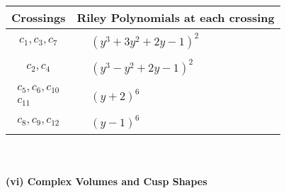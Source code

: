 \documentclass[1p]{elsarticle_modified}
\theoremstyle{definition}
\begin{document}
\begin{tabular}{m{50pt}|m{274pt}}
Crossings & \hspace{64pt}Riley Polynomials at each crossing \\
\hline $$\begin{aligned}c_{1},c_{3},c_{7}\end{aligned}$$&$\begin{aligned}
&(y^3+3 y^2+2 y-1)^2
\end{aligned}$\\
\hline $$\begin{aligned}c_{2},c_{4}\end{aligned}$$&$\begin{aligned}
&(y^3- y^2+2 y-1)^2
\end{aligned}$\\
\hline $$\begin{aligned}c_{5},c_{6},c_{10}\\c_{11}\end{aligned}$$&$\begin{aligned}
&(y+2)^6
\end{aligned}$\\
\hline $$\begin{aligned}c_{8},c_{9},c_{12}\end{aligned}$$&$\begin{aligned}
&(y-1)^6
\end{aligned}$\\
\hline
\end{tabular}\\~\\
\newpage\flushleft \textbf{(vi) Complex Volumes and Cusp Shapes}
\end{document}
